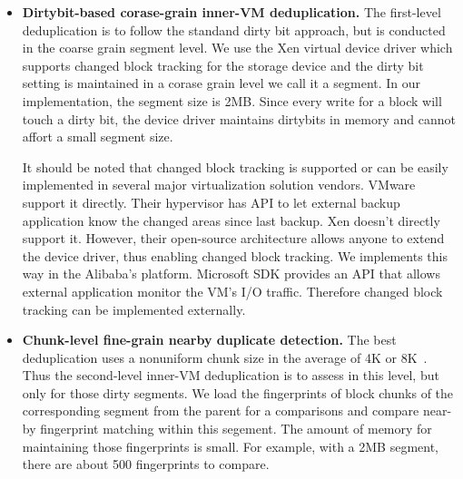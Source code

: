 \begin{itemize}
\item \textbf{Dirtybit-based corase-grain inner-VM deduplication.}
The first-level deduplication is to follow the standand dirty bit approach, but is conducted
in the coarse grain segment level.
We use the  Xen virtual device driver which supports changed block tracking
for the storage device
and the dirty bit setting is maintained in a corase grain level we call it a segment.
In our implementation, the segment size is 2MB. 
Since every write for a block will touch a dirty bit, the device driver maintains dirtybits in memory
and cannot affort a small segment  size.

It should be noted that changed block tracking is supported or can be easily implemented in several 
major virtualization solution vendors. 
VMware support it directly. Their hypervisor has API to let external backup application know 
the changed areas since last backup.  Xen doesn't directly support it. However, their open-source 
architecture allows anyone to extend the device driver, thus enabling changed block tracking. 
We implements this way in the Alibaba's platform.  
Microsoft SDK provides an API that allows external application monitor 
the VM's I/O traffic.  Therefore changed block tracking can be implemented externally. 

\item \textbf{Chunk-level fine-grain nearby duplicate detection.}
The best deduplication uses a nonuniform chunk size 
in the average of 4K or 8K~\cite{??}.
Thus the second-level inner-VM deduplication is to assess in this
level, but only for those dirty  segments. 
We load the fingerprints of block chunks of the corresponding segment from the
parent for a comparisons and compare near-by fingerprint matching within this segement.
The amount of memory for maintaining those fingerprints  is small.
For example, with a 2MB segment, there are about 500 fingerprints to compare.


%


\end{itemize}
